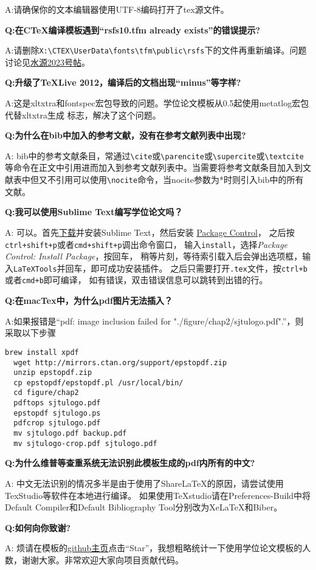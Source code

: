 A:请确保你的文本编辑器使用UTF-8编码打开了tex源文件。

{\bfseries{}Q:在CTeX编译模板遇到“rsfs10.tfm already exists”的错误提示?}

A:请删除\verb+X:\CTEX\UserData\fonts\tfm\public\rsfs+下的文件再重新编译。问题讨论见\href{https://bbs.sjtu.edu.cn/bbstcon,board,TeX_LaTeX,reid,1352982719.html}{水源2023号帖}。

{\bfseries{}Q:升级了TeXLive 2012，编译后的文档出现“minus”等字样?}

A:这是xltxtra和fontspec宏包导致的问题。学位论文模板从0.5起使用metatlog宏包代替xltxtra生成 \XeTeX 标志，解决了这个问题。

{\bfseries{}Q:为什么在bib中加入的参考文献，没有在参考文献列表中出现?}

A: bib中的参考文献条目，常通过\verb+\cite+或\verb+\parencite+或\verb+\supercite+或\verb+\textcite+等命令在正文中引用进而加入到参考文献列表中。当需要将参考文献条目加入到文献表中但又不引用可以使用\verb+\nocite+命令，当nocite参数为*时则引入bib中的所有文献。

{\bfseries{}Q:我可以使用Sublime Text编写学位论文吗？}

A: 可以。首先\href{https://www.sublimetext.com/}{下载}并安装Sublime Text，然后安装
\href{https://packagecontrol.io/installation}{Package Control}，
之后按\verb|ctrl+shift+p|或者\verb|cmd+shift+p|调出命令窗口，
输入\verb|install|，选择\textit{Package Control: Install Package}，按回车，
稍等片刻，等待索引载入后会弹出选项框，输入\verb|LaTeXTools|并回车，即可成功安装插件。
之后只需要打开\verb|.tex|文件，按\verb|ctrl+b|或者\verb|cmd+b|即可编译，
如有错误，双击错误信息可以跳转到出错的行。

{\bfseries{}Q:在macTex中，为什么pdf图片无法插入？}

A:如果报错是“pdf: image inclusion failed for "./figure/chap2/sjtulogo.pdf".”，则采取以下步骤

\begin{lstlisting}[basicstyle=\small\ttfamily, caption={编译模板}, numbers=none]
  brew install xpdf
  wget http://mirrors.ctan.org/support/epstopdf.zip
  unzip epstopdf.zip
  cp epstopdf/epstopdf.pl /usr/local/bin/
  cd figure/chap2
  pdftops sjtulogo.pdf
  epstopdf sjtulogo.ps
  pdfcrop sjtulogo.pdf
  mv sjtulogo.pdf backup.pdf
  mv sjtulogo-crop.pdf sjtulogo.pdf
\end{lstlisting}

{\bfseries{}Q:为什么维普等查重系统无法识别此模板生成的pdf内所有的中文?}

A: 中文无法识别的情况多半是由于使用了ShareLaTeX的原因，请尝试使用TexStudio等软件在本地进行编译。
如果使用TeXstudio请在Preferences-Build中将Default Compiler和Default Bibliography Tool分别改为XeLaTeX和Biber。

{\bfseries{}Q:如何向你致谢?}

A: 烦请在模板的\href{https://github.com/sjtug/SJTUThesis}{github主页}点击“Star”，我想粗略统计一下使用学位论文模板的人数，谢谢大家。非常欢迎大家向项目贡献代码。
